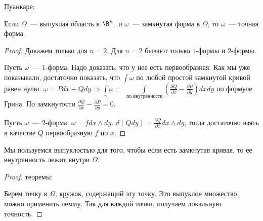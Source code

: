 \begin{lemma} Пуанкаре:

    Если $\Omega$~--- выпуклая область в $\R^n$, и $\omega$~--- замкнутая форма в $\Omega$, то $\omega$~--- точная форма.
\end{lemma}

\begin{proof}
    Докажем только для $n = 2$.
    Для $n = 2$ бывают только $1$-формы и $2$-формы.

    Пусть $\omega$~--- $1$-форма. Надо доказать, что у нее есть первообразная. Как мы уже показывали,
    достаточно показать, что $\int \omega$ по любой простой замкнутой кривой равен нулю.
    $\omega = P dx + Q dy \Rightarrow \int \limits_{\gamma} \omega = $
    $\int \limits_{\texttt{по внутренности}} (\frac{\partial Q}{\partial x} - \frac{\partial P}{\partial y}) dx dy$ по формуле Грина.
    По замкнутости $\frac{\partial Q}{\partial x} - \frac{\partial P}{\partial y} = 0$.

    Пусть $\omega$~--- $2$-форма. $\omega = f dx \wedge dy$.
    $d(Q dy) = \frac{\partial Q}{\partial x} dx \wedge dy$, тогда достаточно взять в качестве $Q$ первообразную $f$ по $x$.
\end{proof}

\begin{observation}
    Мы пользуемся выпуклостью для того, чтобы если есть замкнутая кривая, то ее внутренность лежит внутри $\Omega$.
\end{observation}

\begin{proof} теоремы:

    Берем точку в $\Omega$, кружок, содержащий эту точку. Это выпуклое множество, можно применить лемму.
    Так для каждой точки, получаем локальную точность.
\end{proof}

